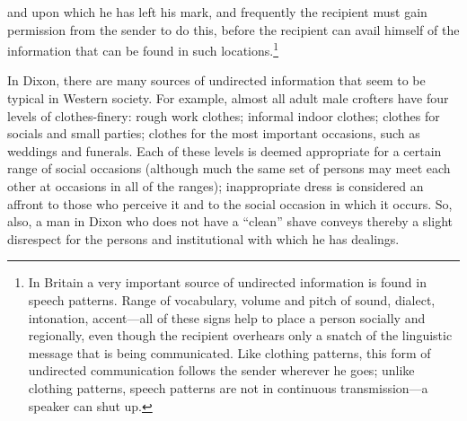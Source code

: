 \documentclass[openany,nobib]{tufte-book}
\begin{document}
and upon which he has left his mark, and frequently the recipient must
gain permission from the sender to do this, before the recipient can
avail himself of the information that can be found in such
locations.\footnote{In Britain a very important source of undirected
  information is found in speech patterns. Range of vocabulary, volume
  and pitch of sound, dialect, intonation, accent---all of these signs
  help to place a person socially and regionally, even though the
  recipient overhears only a snatch of the linguistic message that is
  being communicated. Like clothing patterns, this form of undirected
  communication follows the sender wherever he goes; unlike clothing
  patterns, speech patterns are not in continuous transmission---a
  speaker can shut up.}

In Dixon, there are many sources of undirected information that seem to
be typical in Western society. For example, almost all adult male
crofters have four levels of clothes-finery: rough work clothes;
informal indoor clothes; clothes for socials and small parties; clothes
for the most important occasions, such as weddings and funerals. Each of
these levels is deemed appropriate for a certain range of social
occasions (although much the same set of persons may meet each other at
occasions in all of the ranges); inappropriate dress is considered an
affront to those who perceive it and to the social occasion in which it
occurs. So, also, a man in Dixon who does not have a ``clean'' shave
conveys thereby a slight disrespect for the persons and institutional
with which he has dealings.
\end{document}
